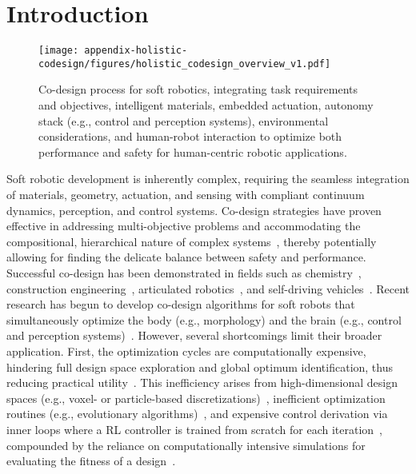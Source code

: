 \section{Introduction}
\begin{figure*}[ht]
    \centering
    \texttt{[image: appendix-holistic-codesign/figures/holistic\_codesign\_overview\_v1.pdf]}
    \caption{Co-design process for soft robotics, integrating task requirements and objectives, intelligent materials, embedded actuation, autonomy stack (e.g., control and perception systems), environmental considerations, and human-robot interaction to optimize both performance and safety for human-centric robotic applications.}
    \label{fig:apx:holisticcodesign:overview}
\end{figure*}

Soft robotic development is inherently complex, requiring the seamless integration of materials, geometry, actuation, and sensing with compliant continuum dynamics, perception, and control systems. Co-design strategies have proven effective in addressing multi-objective problems and accommodating the compositional, hierarchical nature of complex systems~\citep{zardini2023co}, thereby potentially allowing for finding the delicate balance between safety and performance. Successful co-design has been demonstrated in fields such as chemistry~\citep{norskov2009towards,vaissier2018computational}, construction engineering~\citep{knippers2021integrative}, articulated robotics~\citep{ha2018computational,zhao2020robogrammar}, and self-driving vehicles~\citep{zardini2021co}.
% 
Recent research has begun to develop co-design algorithms for soft robots that simultaneously optimize the body (e.g., morphology) and the brain (e.g., control and perception systems)~\citep{van2018spatial, spielberg2019learning, chen2020design, bhatia2021evolution, spielberg2021co, wang2023preco, medvet2021biodiversity, wang2022curriculum, junge2022leveraging, legrand2023reconfigurable, wang2024diffusebot, navez2024contributions}. However, several shortcomings limit their broader application. First, the optimization cycles are computationally expensive, hindering full design space exploration and global optimum identification, thus reducing practical utility~\citep{chen2020design}. This inefficiency arises from high-dimensional design spaces (e.g., voxel- or particle-based discretizations)~\citep{spielberg2019learning, medvet2021biodiversity, medvet2022impact, wang2022curriculum, legrand2023reconfigurable, wang2023softzoo, wang2023preco, wang2024diffusebot}, inefficient optimization routines (e.g., evolutionary algorithms)~\citep{chen2020design, rieffel2014growing, hiller2012automatic, bhatia2021evolution, medvet2021biodiversity, medvet2022impact}, and expensive control derivation via inner loops where a \gls{RL} controller is trained from scratch for each iteration~\citep{bhatia2021evolution, wang2022curriculum, wang2023softzoo, wang2023preco}, compounded by the reliance on computationally intensive simulations for evaluating the fitness of a design~\citep{spielberg2019learning, medvet2021biodiversity, medvet2022impact, wang2022curriculum, legrand2023reconfigurable, wang2023softzoo, wang2023preco, wang2024diffusebot}.
